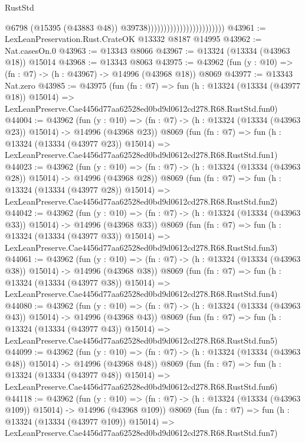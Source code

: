 \begin{lexlean}{RustStd}
\begin{coremodule}
                                                    @6798
                                                    (@15395 (@43883 @48))
                                                    @39738))))))))))))))))))))))))
@43961 := LexLeanPreservation.Rust.CrateOK @13332 @8187 @14995
@43962 := Nat.casesOn.{0}
@43963 := @13343 @8066
@43967 := @13324 (@13334 (@43963 @18)) @15014
@43968 := @13343 @8063
@43975 := @43962 (fun (y : @10) => (fn : @7) -> (h : @43967) -> @14996 (@43968 @18)) @8069
@43977 := @13343 Nat.zero
@43985 := @43975
    (fun (fn : @7) =>
    fun (h : @13324 (@13334 (@43977 @18)) @15014) =>
    LexLeanPreserve.Cae4456d77aa62528ed0bd9d0612cd278.R68.RustStd.fun0)
@44004 := @43962
    (fun (y : @10) => (fn : @7) -> (h : @13324 (@13334 (@43963 @23)) @15014) -> @14996 (@43968 @23))
    @8069
    (fun (fn : @7) =>
    fun (h : @13324 (@13334 (@43977 @23)) @15014) =>
    LexLeanPreserve.Cae4456d77aa62528ed0bd9d0612cd278.R68.RustStd.fun1)
@44023 := @43962
    (fun (y : @10) => (fn : @7) -> (h : @13324 (@13334 (@43963 @28)) @15014) -> @14996 (@43968 @28))
    @8069
    (fun (fn : @7) =>
    fun (h : @13324 (@13334 (@43977 @28)) @15014) =>
    LexLeanPreserve.Cae4456d77aa62528ed0bd9d0612cd278.R68.RustStd.fun2)
@44042 := @43962
    (fun (y : @10) => (fn : @7) -> (h : @13324 (@13334 (@43963 @33)) @15014) -> @14996 (@43968 @33))
    @8069
    (fun (fn : @7) =>
    fun (h : @13324 (@13334 (@43977 @33)) @15014) =>
    LexLeanPreserve.Cae4456d77aa62528ed0bd9d0612cd278.R68.RustStd.fun3)
@44061 := @43962
    (fun (y : @10) => (fn : @7) -> (h : @13324 (@13334 (@43963 @38)) @15014) -> @14996 (@43968 @38))
    @8069
    (fun (fn : @7) =>
    fun (h : @13324 (@13334 (@43977 @38)) @15014) =>
    LexLeanPreserve.Cae4456d77aa62528ed0bd9d0612cd278.R68.RustStd.fun4)
@44080 := @43962
    (fun (y : @10) => (fn : @7) -> (h : @13324 (@13334 (@43963 @43)) @15014) -> @14996 (@43968 @43))
    @8069
    (fun (fn : @7) =>
    fun (h : @13324 (@13334 (@43977 @43)) @15014) =>
    LexLeanPreserve.Cae4456d77aa62528ed0bd9d0612cd278.R68.RustStd.fun5)
@44099 := @43962
    (fun (y : @10) => (fn : @7) -> (h : @13324 (@13334 (@43963 @48)) @15014) -> @14996 (@43968 @48))
    @8069
    (fun (fn : @7) =>
    fun (h : @13324 (@13334 (@43977 @48)) @15014) =>
    LexLeanPreserve.Cae4456d77aa62528ed0bd9d0612cd278.R68.RustStd.fun6)
@44118 := @43962
    (fun (y : @10) =>
    (fn : @7) -> (h : @13324 (@13334 (@43963 @109)) @15014) -> @14996 (@43968 @109))
    @8069
    (fun (fn : @7) =>
    fun (h : @13324 (@13334 (@43977 @109)) @15014) =>
    LexLeanPreserve.Cae4456d77aa62528ed0bd9d0612cd278.R68.RustStd.fun7)

\end{coremodule}
\end{lexlean}
